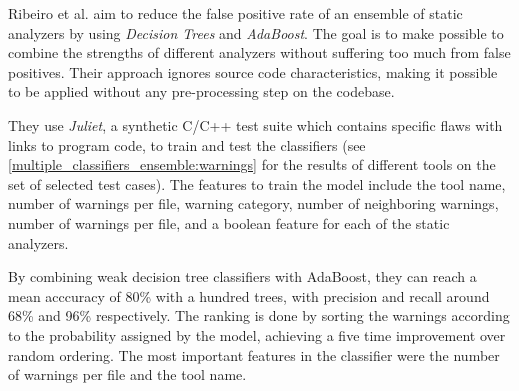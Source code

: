  Ribeiro et al. \cite{multiple_ensemble} aim to reduce the false positive rate of an ensemble of static analyzers by using \textit{Decision Trees} and \textit{AdaBoost}. The goal is to make possible to combine the strengths of different analyzers without suffering too much from false positives. Their approach ignores source code characteristics, making it possible to be applied without any pre-processing step on the codebase.

 They use \textit{Juliet}, a synthetic C/C++ test suite which contains specific flaws with links to program code, to train and test the classifiers (see \cref{multiple_classifiers_ensemble:warnings} for the results of different tools on the set of selected test cases). The features to train the model include the tool name, number of warnings per file, warning category, number of neighboring warnings, number of warnings per file, and a boolean feature for each of the static analyzers.

 By combining weak decision tree classifiers with AdaBoost, they can reach a mean acccuracy of 80\% with a hundred trees, with precision and recall around 68\% and 96\% respectively. The ranking is done by sorting the warnings according to the probability assigned by the model, achieving a five time improvement over random ordering. The most important features in the classifier were the number of warnings per file and the tool name.

